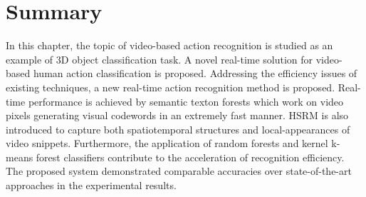 \section{Summary}
\label{sec/act/discussion}
In this chapter, the topic of video-based action recognition is studied as an example of 3D object classification task. A novel real-time solution for video-based human action classification is proposed. 
Addressing the efficiency issues of existing techniques, a new real-time action recognition method is proposed. 
Real-time performance is achieved by semantic texton forests which work on video pixels generating visual codewords in an extremely fast manner. HSRM is also introduced to capture both spatiotemporal structures and local-appearances of video snippets. 
Furthermore, the application of random forests and kernel k-means forest classifiers contribute to the acceleration of recognition efficiency. 
The proposed system demonstrated comparable accuracies over state-of-the-art approaches in the experimental results. 
